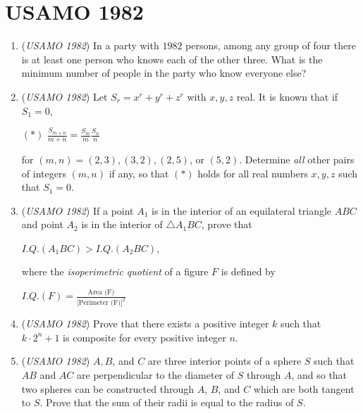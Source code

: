 \section{USAMO 1982}
        \begin{enumerate}
        	\item (\textit{USAMO 1982}) In a party with $1982$ persons, among any group of four there is at least one person who knows each of the other three. What is the minimum number of people in the party who know everyone else?


 

	\item (\textit{USAMO 1982}) Let $S_r=x^r+y^r+z^r$ with $x,y,z$ real. It is known that if $S_1=0$,


 $(*)$ $\frac{S_{m+n}}{m+n}=\frac{S_m}{m}\frac{S_n}{n}$


 for $(m,n)=(2,3),(3,2),(2,5)$, or $(5,2)$. Determine \textit{all} other pairs of integers $(m,n)$ if any, so that $(*)$ holds for all real numbers $x,y,z$ such that $S_1=0$.


 

	\item (\textit{USAMO 1982}) If a point $A_1$ is in the interior of an equilateral triangle $ABC$ and point $A_2$ is in the interior of $\triangle{A_1BC}$, prove that


 $I.Q. (A_1BC) > I.Q.(A_2BC)$,


 where the \textit{isoperimetric quotient} of a figure $F$ is defined by


 $I.Q.(F) = \frac{\text{Area (F)}}{\text{[Perimeter (F)]}^2}$


	\item (\textit{USAMO 1982}) Prove that there exists a positive integer $k$ such that $k\cdot2^n+1$ is composite for every positive integer $n$.


 

	\item (\textit{USAMO 1982}) $A,B$, and $C$ are three interior points of a sphere $S$ such that $AB$ and $AC$ are perpendicular to the diameter of $S$ through $A$, and so that two spheres can be constructed through $A$, $B$, and $C$ which are both tangent to $S$. Prove that the sum of their radii is equal to the radius of $S$.


 

\end{enumerate}